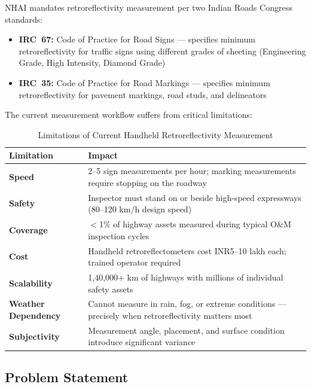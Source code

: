 \documentclass[11pt,a4paper]{article}
\newcommand{\rupmark}{\textrm{INR}}
\begin{document}
NHAI mandates retroreflectivity measurement per two Indian Roads Congress standards:

\begin{itemize}[noitemsep]
    \item \textbf{IRC~67:} Code of Practice for Road Signs --- specifies minimum retroreflectivity for traffic signs using different grades of sheeting (Engineering Grade, High Intensity, Diamond Grade)
    \item \textbf{IRC~35:} Code of Practice for Road Markings --- specifies minimum retroreflectivity for pavement markings, road studs, and delineators
\end{itemize}

The current measurement workflow suffers from critical limitations:

\begin{table}[H]
\centering
\caption{Limitations of Current Handheld Retroreflectivity Measurement}
\label{tab:limitations}
\begin{tabular}{@{}p{3.5cm}p{10cm}@{}}
\toprule
\textbf{Limitation} & \textbf{Impact} \\
\midrule
\textbf{Speed} & 2--5 sign measurements per hour; marking measurements require stopping on the roadway \\
\textbf{Safety} & Inspector must stand on or beside high-speed expressways (80--120 km/h design speed) \\
\textbf{Coverage} & $<$1\% of highway assets measured during typical O\&M inspection cycles \\
\textbf{Cost} & Handheld retroreflectometers cost \rupmark 5--10 lakh each; trained operator required \\
\textbf{Scalability} & 1,40,000+ km of highways with millions of individual safety assets \\
\textbf{Weather Dependency} & Cannot measure in rain, fog, or extreme conditions --- precisely when retroreflectivity matters most \\
\textbf{Subjectivity} & Measurement angle, placement, and surface condition introduce significant variance \\
\bottomrule
\end{tabular}
\end{table}


\subsection{Problem Statement}
\end{document}
